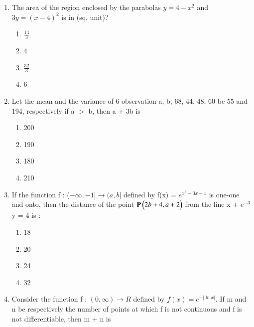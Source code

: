 \documentclass[journal]{IEEEtran}
\numberwithin{equation}{enumi}
\numberwithin{figure}{enumi}
\begin{document}
\begin{enumerate}
\begin{multicols}{4}
\begin{enumerate}
    \end{enumerate} 
    \end{multicols}
    \bigskip
    \item The area of the region enclosed by the parabolas $y = 4 - x^2$ and $3y = (x - 4)^2$ is in (sq. unit)?
    \begin{multicols}{4}
    \begin{enumerate}
        \item $\frac{14}{3}$
        \item 4
        \item $\frac{32}{3}$
        \item 6
    \end{enumerate} 
    \end{multicols}
    \bigskip
    \item Let the mean and the variance of 6 observation a, b, 68, 44, 48, 60 be 55 and 194, respectively if a $>$ b, then a + 3b is
    \begin{multicols}{4}
    \begin{enumerate}
        \item 200
        \item 190
        \item 180
        \item 210
    \end{enumerate} 
    \end{multicols}
    \bigskip
    \item If the function f : ($-\infty , -1] \rightarrow (a , b]$ defined by f(x) = $e^{x^3 -3x + 1}$ is one-one and onto, then the distance of the point $\mathbf{P}\begin{pmatrix}2b + 4, a + 2\end{pmatrix}$ from the line x + $ e^{-3} $y = 4 is :  
    \begin{multicols}{4}
    \begin{enumerate}
        \item 18
        \item 20
        \item 24
        \item 32
    \end{enumerate} 
    \end{multicols}
    \bigskip
    \item Consider the function f : $(0 , \infty) \rightarrow R$ defined by $f (x) = e^{-|\ln{x}|}$. If m and n be respectively the number of points at which f is not continuous and f is not differentiable, then m + n is  
    \begin{multicols}{4}
    \begin{enumerate}

\end{enumerate}
\end{multicols}
\end{enumerate}
\end{document}
